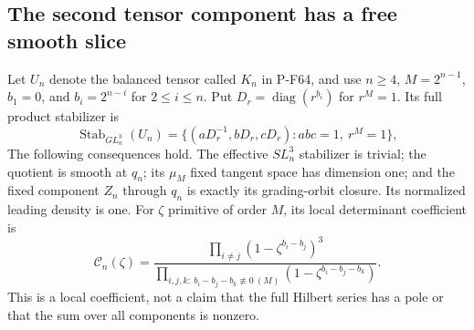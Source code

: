 \subsection{The second tensor component has a free smooth slice}

\begin{proposition}
\label{prop:tensorsecondlocal}
Let $U_n$ denote the balanced tensor called $K_n$ in P-F64, and use
$n\ge4$, $M=2^{n-1}$, $b_1=0$, and $b_i=2^{n-i}$ for $2\le i\le n$.
Put $D_r=\operatorname{diag}(r^{b_i})$ for $r^M=1$.
Its full product stabilizer is
\[
 \operatorname{Stab}_{GL_n^3}(U_n)
 =\{(aD_r^{-1},bD_r,cD_r):abc=1,\ r^M=1\},             \tag{P-F65a}
\]
The following consequences hold.  The effective $SL_n^3$ stabilizer is
trivial; the quotient is smooth at $q_n$; its $\mu_M$ fixed tangent
space has dimension one; and the fixed component $Z_n$ through $q_n$
is exactly its grading-orbit closure.  Its normalized leading density
is one.  For $\zeta$ primitive of order $M$, its local determinant
coefficient is
\[
 \mathcal C_n(\zeta)=
 \frac{\displaystyle\prod_{i\ne j}(1-\zeta^{b_i-b_j})^3}
 {\displaystyle\prod_{i,j,k:\ b_i-b_j-b_k\not\equiv0\ (M)}
                  (1-\zeta^{b_i-b_j-b_k})}.             \tag{P-F65b}
\]
This is a local coefficient, not a claim that the full Hilbert series
has a pole or that the sum over all components is nonzero.
\end{proposition}

